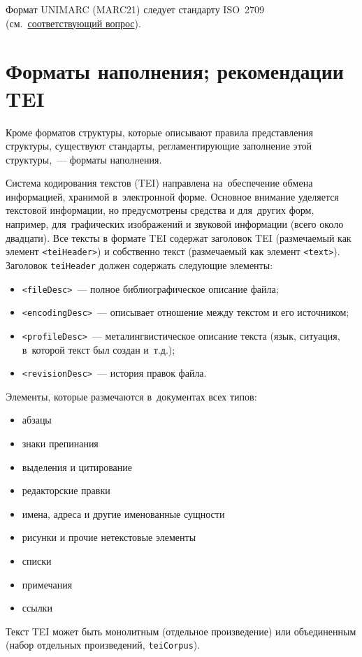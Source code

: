 \documentclass[12pt]{article}
\theoremstyle{definition}
\theoremstyle{remark}
\numberwithin{equation}{section}
\begin{document}
Формат UNIMARC (MARC21) следует стандарту ISO~2709
(см.~\hyperref[subsec:ISO]{соответствующий вопрос}).

\section{Форматы наполнения; рекомендации TEI}
\label{sec:TEI}
Кроме форматов структуры, которые описывают правила представления
структуры, существуют стандарты, регламентирующие заполнение этой
структуры,~--- форматы наполнения.

Система кодирования текстов (TEI) направлена на~обеспечение обмена
информацией, хранимой в~электронной форме. Основное внимание
уделяется текстовой информации, но предусмотрены средства и для~других
форм, например, для~графических изображений и звуковой информации
(всего около двадцати). Все тексты в формате TEI содержат заголовок
TEI (размечаемый как элемент \texttt{<teiHeader>}) и собственно текст
(размечаемый как элемент \texttt{<text>}). Заголовок \texttt{teiHeader}
должен содержать следующие элементы:
\begin{itemize}
    \item \texttt{<fileDesc>}~--- полное библиографическое описание файла;
    \item \texttt{<encodingDesc>}~--- описывает отношение между текстом
    и его источником;
    \item \texttt{<profileDesc>}~--- металингвистическое описание текста
    (язык, ситуация, в~которой текст был создан и~т.д.);
    \item \texttt{<revisionDesc>}~--- история правок файла.
\end{itemize}
Элементы, которые размечаются в~документах всех типов:
\begin{itemize}
    \item абзацы
    \item знаки препинания
    \item выделения и цитирование
    \item редакторские правки
    \item имена, адреса и другие именованные сущности
    \item рисунки и прочие нетекстовые элементы
    \item списки
    \item примечания
    \item ссылки
\end{itemize}
Текст TEI может быть монолитным (отдельное произведение) или
объединенным (набор отдельных произведений, \texttt{teiCorpus}).
\end{document}

